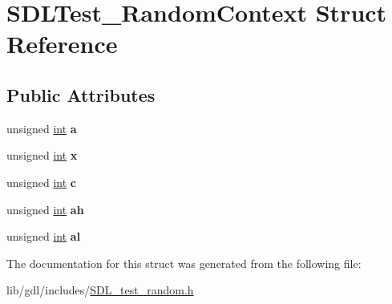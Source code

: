 \hypertarget{struct_s_d_l_test___random_context}{}\section{S\+D\+L\+Test\+\_\+\+Random\+Context Struct Reference}
\label{struct_s_d_l_test___random_context}
\subsection*{Public Attributes}
\begin{DoxyCompactItemize}
\item 
\hypertarget{struct_s_d_l_test___random_context_a24f830d6cb476c96fbe325c99331e45f}{}unsigned \hyperlink{_s_d_l__thread_8h_a6a64f9be4433e4de6e2f2f548cf3c08e}{int} {\bfseries a}\label{struct_s_d_l_test___random_context_a24f830d6cb476c96fbe325c99331e45f}

\item 
\hypertarget{struct_s_d_l_test___random_context_a8bd6d1b4e1677ed1c06f5cc09f1af5b6}{}unsigned \hyperlink{_s_d_l__thread_8h_a6a64f9be4433e4de6e2f2f548cf3c08e}{int} {\bfseries x}\label{struct_s_d_l_test___random_context_a8bd6d1b4e1677ed1c06f5cc09f1af5b6}

\item 
\hypertarget{struct_s_d_l_test___random_context_a17a6a7e7b68a33c67d9b74c8c7c33198}{}unsigned \hyperlink{_s_d_l__thread_8h_a6a64f9be4433e4de6e2f2f548cf3c08e}{int} {\bfseries c}\label{struct_s_d_l_test___random_context_a17a6a7e7b68a33c67d9b74c8c7c33198}

\item 
\hypertarget{struct_s_d_l_test___random_context_a2c8d2f1ee16cdfd38361b8f03b3fdb85}{}unsigned \hyperlink{_s_d_l__thread_8h_a6a64f9be4433e4de6e2f2f548cf3c08e}{int} {\bfseries ah}\label{struct_s_d_l_test___random_context_a2c8d2f1ee16cdfd38361b8f03b3fdb85}

\item 
\hypertarget{struct_s_d_l_test___random_context_a0e2bccd3611d383d6510c6c828aa54c4}{}unsigned \hyperlink{_s_d_l__thread_8h_a6a64f9be4433e4de6e2f2f548cf3c08e}{int} {\bfseries al}\label{struct_s_d_l_test___random_context_a0e2bccd3611d383d6510c6c828aa54c4}

\end{DoxyCompactItemize}


The documentation for this struct was generated from the following file\+:\begin{DoxyCompactItemize}
\item 
lib/gdl/includes/\hyperlink{_s_d_l__test__random_8h}{S\+D\+L\+\_\+test\+\_\+random.\+h}\end{DoxyCompactItemize}
